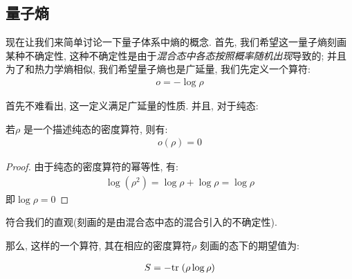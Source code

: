 \subsection{量子熵}

现在让我们来简单讨论一下量子体系中熵的概念. 首先, 我们希望这一量子熵刻画某种不确定性,
这种不确定性是由于\emph{混合态中各态按照概率随机出现}导致的; 并且为了和热力学熵相似,
我们希望量子熵也是广延量, 我们先定义一个算符:
\begin{equation}
  \begin{aligned}
    o = -\log \rho
  \end{aligned}
\end{equation}

首先不难看出, 这一定义满足广延量的性质. 并且, 对于纯态:

\begin{theorem}
若$\rho$ 是一个描述纯态的密度算符, 则有:  
\begin{equation}
  \begin{aligned}
    o(\rho) = 0
  \end{aligned}
\end{equation}
\end{theorem}
\begin{proof}
  由于纯态的密度算符的幂等性, 有:
  \begin{equation}
    \begin{aligned}
      \log(\rho^{2}) = \log \rho + \log \rho = \log \rho
    \end{aligned}
  \end{equation}
  即$\log \rho=0$
\end{proof}

符合我们的直观(刻画的是由混合态中态的混合引入的不确定性).

那么, 这样的一个算符, 其在相应的密度算符$\rho$ 刻画的态下的期望值为:

\begin{equation}
  \begin{aligned}
    S = -{\rm tr}\; (\rho \log \rho)
  \end{aligned}
\end{equation}

